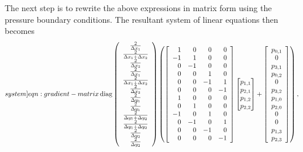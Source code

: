 \documentclass{article}
\numberwithin{equation}{section}
\begin{document}
The next step is to rewrite the above expressions in matrix form using the pressure boundary conditions. The resultant system of linear equations then becomes
\begin{equation}\label[system]{eqn:gradient-matrix}
\operatorname{diag}\left(\begin{array}{cccccc}
\frac{2}{\Delta x_1} \\
\frac{2}{\Delta x_1+\Delta x_2} \\
\frac{2}{\Delta x_2} \\
\frac{2}{\Delta x_1} \\
\frac{2}{\Delta x_1+\Delta x_2} \\
\frac{2}{\Delta x_2}\\
\frac{2}{\Delta y_1}\\
\frac{2}{\Delta y_1}\\
\frac{2}{\Delta y_1+\Delta y_2}\\
\frac{2}{\Delta y_1+\Delta y_2}\\
\frac{2}{\Delta y_2}\\
\frac{2}{\Delta y_2}
\end{array}\right)
\left(\left[
\begin{array}{rrrr}
1 & 0 & 0 & 0 \\
-1 & 1 & 0 & 0 \\
0 & -1 & 0 & 0 \\
0 & 0 & 1 & 0 \\
0 & 0 & -1 & 1 \\
0 & 0 & 0 & -1 \\
1 & 0 & 0 & 0 \\
0 & 1 & 0 & 0 \\
-1 & 0 & 1 & 0 \\
0 & -1 & 0 & 1 \\
0 & 0 & -1 & 0 \\
0 & 0 & 0 & -1
\end{array}
\right]
\begin{bmatrix}{}
  p_{1,1} \\
  p_{2,1} \\
  p_{1,2} \\
  p_{2,2} 
\end{bmatrix}
+\left[\begin{array}{c}
p_{0,1} \\
0 \\
p_{3,1} \\
p_{0,2} \\
0 \\
p_{3,2} \\
p_{1,0} \\
p_{2,0} \\
0 \\
0 \\
p_{1,3} \\
p_{2,3}
\end{array}\right]\right),
\end{equation}
\end{document}
